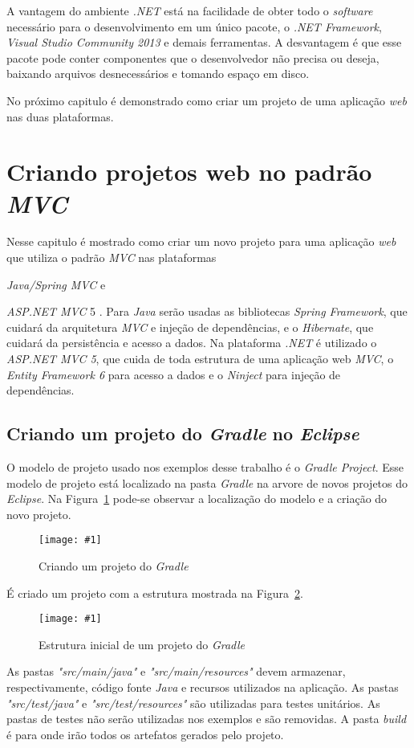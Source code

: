 \documentclass[a4paper,12pt]{article}
\newcommand{\anmvc} {
\sigla{ASP.NET MVC} 5
}
\newcommand{\spring} {
\est{Java/Spring MVC}
}
\newcommand{\figura}[3] {
	\begin{figure}[ht]
		\centering
		\texttt{[image: \#1]}
		\caption{#2}
		\label{#3}
	\end{figure}
	\FloatBarrier
}
\newcommand{\est}[1] {
\textit{#1}}
\newcommand{\arquivo}[1] {
\textit{#1}}
\newcommand{\sigla}[1] {
\textit{#1}}
\newcommand{\lang}[1] {
\textit{#1}}
\begin{document}
A vantagem do ambiente \sigla{.NET} está na facilidade de obter todo o \est{software} necessário para o desenvolvimento em um único pacote, o \est{.NET Framework}, \est{Visual Studio Community 2013} e demais ferramentas. A desvantagem é que esse pacote pode conter componentes que o desenvolvedor não precisa ou deseja, baixando arquivos desnecessários e tomando espaço em disco.

No próximo capitulo é demonstrado como criar um projeto de uma aplicação \est{web} nas duas plataformas.

\newpage
\section{Criando projetos web no padrão \sigla{MVC}}

Nesse capitulo é mostrado como criar um novo projeto para uma aplicação \est{web} que utiliza o padrão \sigla{MVC} nas plataformas \spring e \anmvc. Para \lang{Java} serão usadas as bibliotecas \est{Spring Framework}, que cuidará da arquitetura \sigla{MVC} e injeção de dependências, e o \est{Hibernate}, que cuidará da persistência e acesso a dados. Na plataforma \sigla{.NET} é utilizado o \sigla{ASP.NET MVC 5}, que cuida de toda estrutura de uma aplicação web \sigla{MVC}, o \est{Entity Framework 6} para acesso a dados e o \est{Ninject} para injeção de dependências.

\subsection{Criando um projeto do \est{Gradle} no \est{Eclipse}}

O modelo de projeto usado nos exemplos desse trabalho é o \est{Gradle Project}. Esse modelo de projeto está localizado na pasta \est{Gradle} na arvore de novos projetos do \est{Eclipse}. Na Figura~\ref{fig:gradleproject} pode-se observar a localização do modelo e a criação do novo projeto.

\figura{gradleproject1.png}{Criando um projeto do \est{Gradle}}{fig:gradleproject}

É criado um projeto com a estrutura mostrada na Figura~\ref{fig:gradletree}.

\figura{gradleproject1.png}{Estrutura inicial de um projeto do \est{Gradle}}{fig:gradletree}

As pastas \arquivo{"src/main/java"} e \arquivo{"src/main/resources"} devem armazenar, respectivamente, código fonte \lang{Java} e recursos utilizados na aplicação.  As pastas \arquivo{"src/test/java"} e \arquivo{"src/test/resources"} são utilizadas para testes unitários. As pastas de testes não serão utilizadas nos exemplos e são removidas. A pasta \est{build} é para onde irão todos os artefatos gerados pelo projeto.
\end{document}
